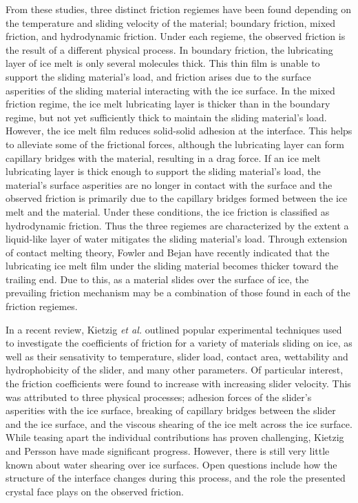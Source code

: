 From these studies, three distinct friction regiemes
have been found depending on the temperature and sliding velocity of the 
material; boundary friction, mixed friction, and hydrodynamic 
friction.\cite{Bhushan2002,Persson2015,Tuononen2016,Kietzig2009,Kietzig2010} 
Under each regieme, the observed 
friction is the result of a different physical process. In boundary friction, 
the lubricating layer of ice melt is only several molecules thick. 
This thin film is unable to support the sliding material's load, and friction
arises due to the surface asperities of the sliding material 
interacting with the ice surface.\cite{Bhushan2002} In the mixed friction 
regime, the ice melt lubricating layer is thicker than in the boundary regime,
but not yet sufficiently thick to maintain the 
sliding material's load. However, the ice melt film reduces solid-solid 
adhesion at the interface. This helps to alleviate some of the frictional 
forces, although the lubricating layer can form capillary bridges with the 
material, resulting in a drag force.\cite{Kietzig2009,Kietzig2010} If an 
ice melt lubricating layer is thick enough
to support the sliding material's load, the material's surface asperities are 
no longer in contact with the surface and the observed friction is primarily 
due to the capillary bridges formed between the ice melt and the material.
Under these conditions, the ice friction is classified as hydrodynamic 
friction.\cite{Kietzig2009,Kietzig2010} Thus the three regiemes are characterized by the 
extent a liquid-like layer of water mitigates the sliding material's load.
Through extension of contact melting theory, Fowler and Bejan have recently 
indicated that the lubricating ice melt film under the sliding material becomes 
thicker toward the trailing end.\cite{Fowler1993} Due to this, as a material 
slides over the surface of ice, the prevailing friction mechanism may be a 
combination of those found in each of the friction regiemes. 

In a recent review\cite{Kietzig2010}, Kietzig \textit{et al.} outlined 
popular experimental techniques used to investigate the coefficients of 
friction for a variety of materials sliding on ice, as well as their 
sensativity to temperature, slider load,
contact area, wettability and hydrophobicity of the slider, and many other
parameters. Of particular interest, the friction coefficients were found to 
increase with increasing slider velocity. This was attributed to three 
physical processes; adhesion forces of the
slider's asperities with the ice surface, breaking of capillary bridges 
between the slider and the ice surface, and the viscous shearing of the 
ice melt across the ice surface. While teasing apart the individual 
contributions has proven challenging, Kietzig\cite{Kietzig2009} and
Persson\cite{Persson2015,Tuononen2016} 
have made significant progress. However, there is still very little known about
water shearing over ice surfaces. Open questions include how the
structure of the interface changes 
during this process, and the role the presented crystal face plays on
the observed friction. 



